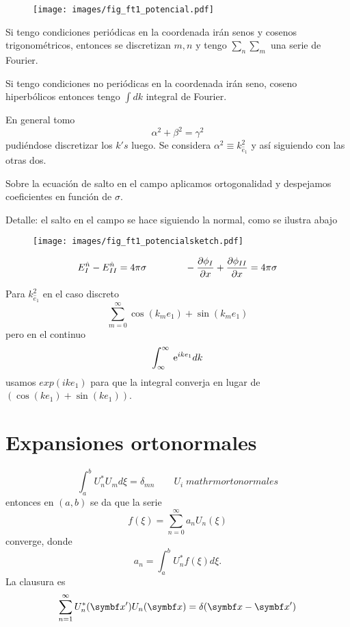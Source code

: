 \documentclass[10pt,oneside]{CBFT_book}
\begin{document}
\begin{figure}[htb]
	\begin{center}
	\texttt{[image: images/fig\_ft1\_potencial.pdf]}	 
	\end{center}
	\caption{}
\end{figure} 
Si tengo condiciones periódicas en la coordenada irán senos y cosenos trigonométricos, entonces se
discretizan $m,n$ y tengo $\sum_n \sum_m$ una serie de Fourier.

Si tengo condiciones no periódicas en la coordenada irán seno, coseno hiperbólicos entonces tengo
$\int dk$ integral de Fourier.

En general tomo
\[
	\alpha^2 + \beta^2 = \gamma^2
\]
pudiéndose discretizar los $k's$ luego. Se considera $\alpha^2 \equiv k_{\hat{e}_1}^2$ y así siguiendo
con las otras dos.

Sobre la ecuación de salto en el campo aplicamos ortogonalidad y despejamos coeficientes en función
de $\sigma$.

Detalle: el salto en el campo se hace siguiendo la normal, como se ilustra abajo
\begin{figure}[htb]
	\begin{center}
	\texttt{[image: images/fig\_ft1\_potencialsketch.pdf]}
	\end{center}
	\caption{}
\end{figure} 
\[
	E_I^{\hat{n}} - E_{II}^{\hat{n}} = 4 \pi \sigma \qquad\qquad 
	- \frac{\partial^{\hspace{-0.05em}} {\phi_I}}{\partial {x}^{\hspace{-0.05em}}} + \frac{\partial^{\hspace{-0.05em}} {\phi_{II}}}{\partial {x}^{\hspace{-0.05em}}} = 4 \pi \sigma
\]

Para $k_{\hat{e}_1}^2$ en el caso discreto
\[
	\sum_{m=0}^\infty \cos(k_m e_1) + \sin(k_m e_1)
\]
pero en el continuo 
\[
	\int_{\infty}^{\infty} \:\mathrm{e}^{ike_1} dk
\]
usamos $exp(ike_1)$ para que la integral converja en lugar de $(\cos(ke_1) + \sin(ke_1))$.

\section{Expansiones ortonormales}

\[
	\int_a^b U^*_n U_m d\xi = \delta_{mn} \qquad U_i \; mathrm{ortonormales}
\]
entonces en $(a,b)$ se da que la serie 
\[
	f(\xi) = \sum_{n=0}^\infty a_n U_n(\xi) 
\]
converge, donde  
\[
	a_n = \int_a^b U^*_n f(\xi) d\xi.
\]
La clausura es
\[
	\sum_{n=1}^\infty U^*_n(\vb{x}') U_n(\vb{x}) = \delta(\vb{x}-\vb{x}')
\]
\end{document}
